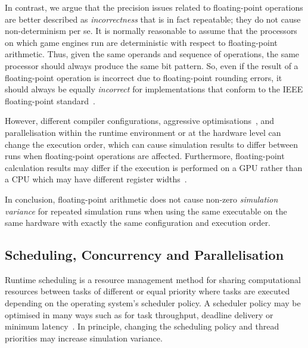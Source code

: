In contrast, we argue that the precision issues related to floating-point operations are better described as \textit{incorrectness} that is in fact repeatable; they do not cause non-determinism per se. 
%
It is normally reasonable to assume that the processors on which game engines run are deterministic with respect to floating-point arithmetic. 
%
Thus, given the same operands and sequence of operations, the same processor should always produce the same bit pattern. 
%
So, even if the result of a floating-point operation is incorrect due to floating-point rounding errors, it should always be equally \textit{incorrect} for implementations that conform to the IEEE floating-point standard~\cite{8766229}.

 

However, different compiler configurations, aggressive optimisations~\cite{llvm-floating-point}, and 
parallelisation within the runtime environment or at the hardware level can change the execution order, which can cause simulation results to differ between runs when floating-point operations are affected. 
%
Furthermore, floating-point calculation results may differ if the execution is performed on a GPU rather than a CPU which may have different register widths~\cite{Whitehead2011}. 

In conclusion, floating-point arithmetic does not cause non-zero \textit{simulation variance} for repeated simulation runs when using the same executable on the same hardware with exactly the same configuration and execution order.


\subsection{Scheduling, Concurrency and Parallelisation}
Runtime scheduling is a resource management method for sharing computational resources between tasks of different or equal priority where tasks are executed depending on the operating system's scheduler policy. A scheduler policy may be optimised in many ways such as for task throughput, deadline delivery or minimum latency~\cite{liu1973scheduling}. 
%
In principle, changing the scheduling policy and thread priorities may increase simulation variance. 

